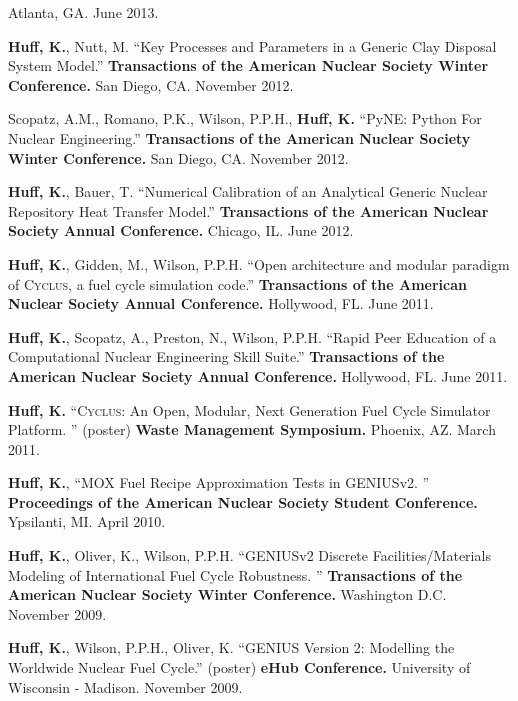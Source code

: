 \documentclass[margin,line]{resume}
\newcommand{\Cyclus}{\textsc{Cyclus}\xspace}%
\begin{document}
\begin{resume}
\begin{bibenum}
         Atlanta, GA. June 2013.
      \item \textbf{Huff, K.}, Nutt, M. ``Key Processes and Parameters in a Generic Clay Disposal System Model.''
         \textbf{Transactions of the American Nuclear Society Winter Conference.}
        San Diego, CA. November 2012.
      \item Scopatz, A.M., Romano, P.K., Wilson, P.P.H., \textbf{Huff, K.} ``PyNE: Python For Nuclear Engineering.''
         \textbf{Transactions of the American Nuclear Society Winter Conference.}
        San Diego, CA. November 2012.
      \item \textbf{Huff, K.}, Bauer, T. ``Numerical Calibration of an Analytical Generic Nuclear Repository Heat Transfer Model.''
         \textbf{Transactions of the American Nuclear Society Annual Conference.}
        Chicago, IL. June 2012.
      \item \textbf{Huff, K.}, Gidden, M., Wilson, P.P.H. ``Open architecture and modular paradigm of \Cyclus, a fuel cycle simulation code.''
         \textbf{Transactions of the American Nuclear Society Annual Conference.}
        Hollywood, FL. June 2011.
      \item \textbf{Huff, K.}, Scopatz, A., Preston, N., Wilson, P.P.H. ``Rapid Peer Education of a Computational Nuclear Engineering Skill Suite.''
         \textbf{Transactions of the American Nuclear Society Annual Conference.}
        Hollywood, FL. June 2011.
      \item \textbf{Huff, K.} ``\Cyclus: An Open, Modular, Next Generation Fuel Cycle Simulator Platform. ''
        (poster)  \textbf{Waste Management Symposium.} Phoenix, AZ. March
        2011.
      \item \textbf{Huff, K.}, ``MOX Fuel Recipe Approximation Tests in GENIUSv2. ''
         \textbf{Proceedings of the American Nuclear Society Student Conference.}
        Ypsilanti, MI. April 2010.
      \item \textbf{Huff, K.}, Oliver, K., Wilson, P.P.H. ``GENIUSv2 Discrete Facilities/Materials Modeling of International
        Fuel Cycle Robustness. ''
         \textbf{Transactions of the American Nuclear Society Winter Conference.}
        Washington D.C. November 2009.
      \item \textbf{Huff, K.}, Wilson, P.P.H., Oliver, K. ``GENIUS Version 2: Modelling the Worldwide Nuclear Fuel Cycle.''
        (poster)  \textbf{eHub Conference.} University of Wisconsin -
        Madison. November 2009.
    \end{bibenum}


\end{resume}
\end{document}

